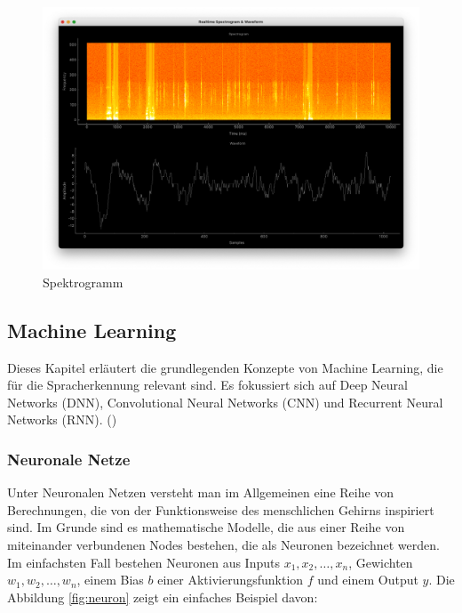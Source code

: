 \documentclass[11pt,a4paper]{article}
\begin{document}
\begin{figure}[h]
	\centering
	\includegraphics[width=0.73\linewidth]{img/spectrogram.png}
	\caption{Spektrogramm}
	\label{fig:spectrogram}
\end{figure}

\subsection{Machine Learning}
Dieses Kapitel erläutert die grundlegenden Konzepte von Machine Learning, die für die 
Spracherkennung relevant sind. Es fokussiert sich auf Deep Neural Networks (DNN), Convolutional 
Neural Networks (CNN) und Recurrent Neural Networks (RNN). (\cite{weidman2019deep})

\subsubsection{Neuronale Netze}
Unter Neuronalen Netzen versteht man im Allgemeinen eine Reihe von Berechnungen, die von der
Funktionsweise des menschlichen Gehirns inspiriert sind. Im Grunde sind es mathematische Modelle,
die aus einer Reihe von miteinander verbundenen Nodes bestehen, die als Neuronen bezeichnet werden.
Im einfachsten Fall bestehen Neuronen aus Inputs \(x_{1}, x_{2}, \dots, x_{n}\), Gewichten 
\(w_{1}, w_{2}, \dots, w_{n}\), einem Bias \(b\) einer Aktivierungsfunktion \(f\) und einem Output 
\(y\). Die Abbildung \ref{fig:neuron} zeigt ein einfaches Beispiel davon:
\end{document}
